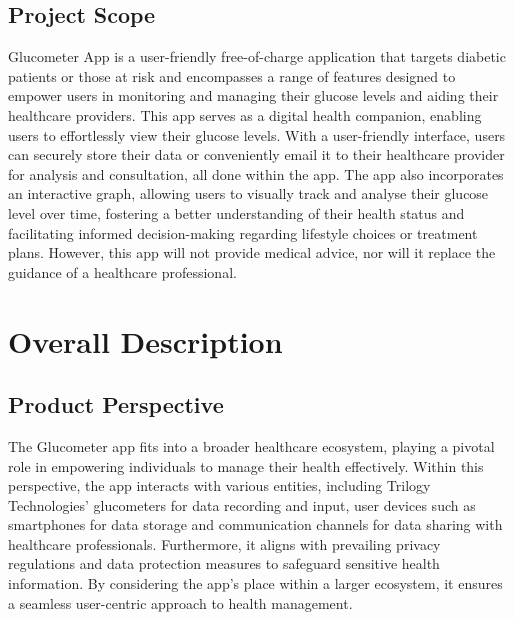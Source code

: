 \documentclass[a4paper]{scrreprt}
\begin{document}
\section{Project Scope}
Glucometer App is a user-friendly free-of-charge application that targets diabetic patients or those at risk and encompasses a range of features designed to empower users in monitoring and managing their glucose levels and aiding their healthcare providers.
\newline
This app serves as a digital health companion, enabling users to effortlessly view their glucose levels. With a user-friendly interface, users can securely store their data or conveniently email it to their healthcare provider for analysis and consultation, all done within the app. The app also incorporates an interactive graph, allowing users to visually track and analyse their glucose level over time, fostering a better understanding of their health status and facilitating informed decision-making regarding lifestyle choices or treatment plans.
\newline
However, this app will not provide medical advice, nor will it replace the guidance of a healthcare professional.
\newline


\chapter{Overall Description}

\section{Product Perspective}
The Glucometer app fits into a broader healthcare ecosystem, playing a pivotal role in empowering individuals to manage their health effectively. Within this perspective, the app interacts with various entities, including Trilogy Technologies’ glucometers for data recording and input, user devices such as smartphones for data storage and communication channels for data sharing with healthcare professionals.
\newline
Furthermore, it aligns with prevailing privacy regulations and data protection measures to safeguard sensitive health information. By considering the app’s place within a larger ecosystem, it ensures a seamless user-centric approach to health management.
\end{document}
